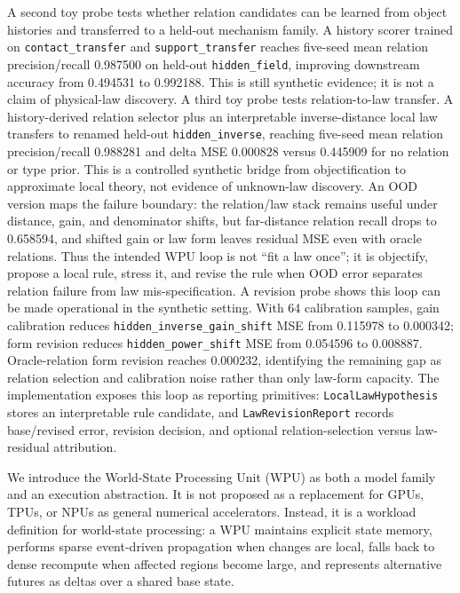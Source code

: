 \documentclass[11pt]{article}
\begin{document}
A second toy probe tests whether relation candidates can be learned from object
histories and transferred to a held-out mechanism family. A history scorer
trained on \texttt{contact\_transfer} and \texttt{support\_transfer} reaches
five-seed mean relation precision/recall 0.987500 on held-out
\texttt{hidden\_field}, improving downstream accuracy from 0.494531 to
0.992188. This is still synthetic evidence; it is not a claim of physical-law
discovery.
A third toy probe tests relation-to-law transfer. A history-derived relation
selector plus an interpretable inverse-distance local law transfers to renamed
held-out \texttt{hidden\_inverse}, reaching five-seed mean relation
precision/recall 0.988281 and delta MSE 0.000828 versus 0.445909 for no relation
or type prior. This is a controlled synthetic bridge from objectification to
approximate local theory, not evidence of unknown-law discovery.
An OOD version maps the failure boundary: the relation/law stack remains useful
under distance, gain, and denominator shifts, but far-distance relation recall
drops to 0.658594, and shifted gain or law form leaves residual MSE even with
oracle relations. Thus the intended WPU loop is not ``fit a law once''; it is
objectify, propose a local rule, stress it, and revise the rule when OOD error
separates relation failure from law mis-specification.
A revision probe shows this loop can be made operational in the synthetic
setting. With 64 calibration samples, gain calibration reduces
\texttt{hidden\_inverse\_gain\_shift} MSE from 0.115978 to 0.000342; form
revision reduces \texttt{hidden\_power\_shift} MSE from 0.054596 to 0.008887.
Oracle-relation form revision reaches 0.000232, identifying the remaining gap as
relation selection and calibration noise rather than only law-form capacity.
The implementation exposes this loop as reporting primitives:
\texttt{LocalLawHypothesis} stores an interpretable rule candidate, and
\texttt{LawRevisionReport} records base/revised error, revision decision, and
optional relation-selection versus law-residual attribution.

We introduce the World-State Processing Unit (WPU) as both a model family and an
execution abstraction. It is not proposed as a replacement for GPUs, TPUs, or
NPUs as general numerical accelerators. Instead, it is a workload definition for
world-state processing: a WPU maintains explicit state memory, performs sparse
event-driven propagation when changes are local, falls back to dense recompute
when affected regions become large, and represents alternative futures as
deltas over a shared base state.
\end{document}
